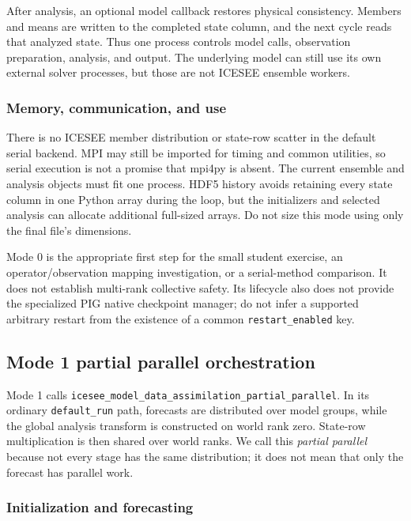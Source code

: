 \documentclass[11pt,a4paper]{article}
\newcommand{\code}[1]{\nolinkurl{#1}}
\begin{document}
After analysis, an optional model callback restores physical consistency. Members and means are written to the completed state column, and the next cycle reads that analyzed state. Thus one process controls model calls, observation preparation, analysis, and output. The underlying model can still use its own external solver processes, but those are not ICESEE ensemble workers.


\subsubsection{Memory, communication, and use}

There is no ICESEE member distribution or state-row scatter in the default serial backend. MPI may still be imported for timing and common utilities, so serial execution is not a promise that mpi4py is absent. The current ensemble and analysis objects must fit one process. HDF5 history avoids retaining every state column in one Python array during the loop, but the initializers and selected analysis can allocate additional full-sized arrays. Do not size this mode using only the final file's dimensions.

Mode 0 is the appropriate first step for the small student exercise, an operator/observation mapping investigation, or a serial-method comparison. It does not establish multi-rank collective safety. Its lifecycle also does not provide the specialized PIG native checkpoint manager; do not infer a supported arbitrary restart from the existence of a common \code{restart_enabled} key.

\subsection{Mode 1 partial parallel orchestration}

Mode 1 calls \code{icesee_model_data_assimilation_partial_parallel}. In its ordinary \code{default_run} path, forecasts are distributed over model groups, while the global analysis transform is constructed on world rank zero. State-row multiplication is then shared over world ranks. We call this \emph{partial parallel} because not every stage has the same distribution; it does not mean that only the forecast has parallel work.

\subsubsection{Initialization and forecasting}
\end{document}
